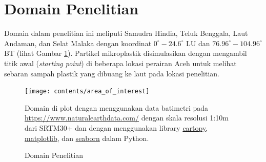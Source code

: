 \vspace{1.5pc}
\section[Domain Penelitian]{Domain Penelitian}
\begin{spacing}{1.5}
	Domain dalam penelitian ini meliputi Samudra Hindia, Teluk Benggala, Laut Andaman, dan Selat Malaka dengan koordinat $0^\circ-24.6^\circ$ LU dan $76.96^\circ-104.96^\circ$ BT (lihat Gambar \ref{fig:domain}). Partikel mikroplastik disimulasikan dengan mengambil titik awal (\textit{starting point}) di beberapa lokasi perairan Aceh untuk melihat sebaran sampah plastik yang dibuang ke laut pada lokasi penelitian. 
	\begin{figure}[H]
		\centering
		\texttt{[image: contents/area\_of\_interest]}
		\caption{Domain Penelitian}
		\label{fig:domain}
		\medspace
		\small
		Domain di plot dengan menggunakan data batimetri pada \href{https://www.naturalearthdata.com/}{https://www.naturalearthdata.com/} dengan skala resolusi 1:10m dari SRTM30+ dan dengan menggunakan library \href{https://scitools.org.uk/cartopy/docs/latest/getting_started/index.html#}{cartopy}, \href{https://matplotlib.org/}{matplotlib}, dan \href{https://seaborn.pydata.org/}{seaborn} dalam Python.
		
	\end{figure}
\end{spacing}
